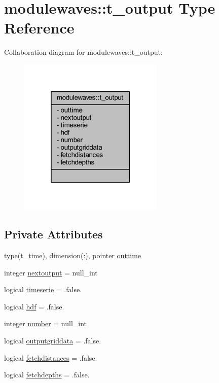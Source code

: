 \hypertarget{structmodulewaves_1_1t__output}{}\section{modulewaves\+:\+:t\+\_\+output Type Reference}
\label{structmodulewaves_1_1t__output}


Collaboration diagram for modulewaves\+:\+:t\+\_\+output\+:\nopagebreak
\begin{figure}[H]
\begin{center}
\leavevmode
\includegraphics[width=196pt]{structmodulewaves_1_1t__output__coll__graph}
\end{center}
\end{figure}
\subsection*{Private Attributes}
\begin{DoxyCompactItemize}
\item 
type(t\+\_\+time), dimension(\+:), pointer \mbox{\hyperlink{structmodulewaves_1_1t__output_a17128b504912876254598e01aa70f8e9}{outtime}}
\item 
integer \mbox{\hyperlink{structmodulewaves_1_1t__output_aa99596b9d6daff2306faf571dd17aba1}{nextoutput}} = null\+\_\+int
\item 
logical \mbox{\hyperlink{structmodulewaves_1_1t__output_a6d49583d7426e16b1512d5a7b7e7de9c}{timeserie}} = .false.
\item 
logical \mbox{\hyperlink{structmodulewaves_1_1t__output_ad6f257265110cddbe74d2ee69b69ecd4}{hdf}} = .false.
\item 
integer \mbox{\hyperlink{structmodulewaves_1_1t__output_a0582a0252d8a90e388de1c8a4f813892}{number}} = null\+\_\+int
\item 
logical \mbox{\hyperlink{structmodulewaves_1_1t__output_a8f765c07f429c04d1b822233c4bee308}{outputgriddata}} = .false.
\item 
logical \mbox{\hyperlink{structmodulewaves_1_1t__output_a2cf9f7a32361c81f48bb9423725d655a}{fetchdistances}} = .false.
\item 
logical \mbox{\hyperlink{structmodulewaves_1_1t__output_a01a821db7ef68f270ff0f9ae407b1483}{fetchdepths}} = .false.
\end{DoxyCompactItemize}


